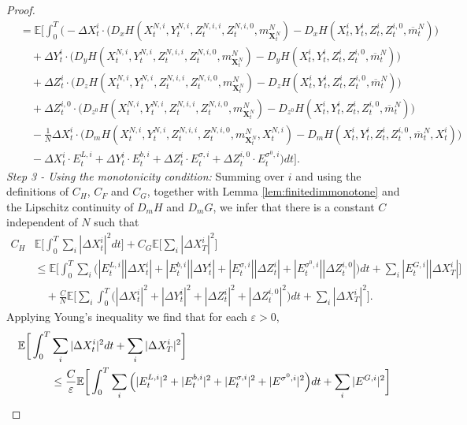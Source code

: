 \documentclass[11pt,reqno]{amsart}
\numberwithin{equation}{section}
\theoremstyle{definition}
\def\E{{\mathbb E}}
\newcommand{\bX}{\mathbf{X}}
\newcommand{\ov}{\overline}
\def \E{\mathbb{E}}
\begin{document}
\begin{proof}
\begin{align*}
&= \E\bigg[ \int_0^T \bigg( - \Delta X_t^i\cdot\Big( D_x H (X_t^{N,i},Y_t^{N,i},Z_t^{N,i,i},Z_t^{N,i,0}, m_{\bX_t^N}^N) - D_x H(X_t^i,Y_t^i,Z_t^i,Z_t^{i,0}, \ov{m}_t^N) \bigg)  \nonumber \\
&\quad + \Delta Y_t^i \cdot \Big(D_y H (X_t^{N,i},Y_t^{N,i},Z_t^{N,i,i},Z_t^{N,i,0}, m_{\bX_t^N}^N) - D_y H(X_t^i,Y_t^i,Z_t^i,Z_t^{i,0}, \ov{m}_t^N) \Big) \nonumber \\ 
&\quad +  \Delta Z_t^{i}\cdot\Big(D_z H (X_t^{N,i},Y_t^{N,i},Z_t^{N,i,i},Z_t^{N,i,0}, m_{\bX_t^N}^N) - D_z H(X_t^i,Y_t^i,Z_t^i,Z_t^{i,0}, \ov{m}_t^N) \Big) \nonumber \\ 
&\quad +  \Delta Z_t^{i,0}\cdot\Big( D_{z^0} H (X_t^{N,i},Y_t^{N,i},Z_t^{N,i,i},Z_t^{N,i,0}, m_{\bX_t^N}^N) - D_{z^0} H(X_t^i,Y_t^i,Z_t^i,Z_t^{i,0}, \ov{m}_t^N) \Big)   \nonumber \\
& \quad - \frac{1}{N} \Delta X_t^i \cdot \big(D_m H(X_t^{N,i}, Y_t^{N,i}, Z_t^{N,i,i}, Z_t^{N,i,0}, m_{\bX_t^N}^N, X_t^{N,i})
 - D_m H(X_t^{i}, Y_t^{i}, Z_t^{i}, Z_t^{i,0}, \ov{m}_t^N, X_t^i)
  \big) \nonumber \\
& \quad - \Delta X_t^i \cdot E_t^{L,i} + \Delta Y_t^i \cdot E_t^{b,i} + \Delta Z_t^i \cdot E_t^{\sigma,i} + \Delta Z_t^{i,0} \cdot E_t^{\sigma^0,i} \bigg) dt \bigg]. 
\end{align*}
\textit{Step 3 - Using the monotonicity condition:}
Summing over $i$ and using the definitions of $C_H$, $C_F$ and $C_G$, together with Lemma \ref{lem:finitedimmonotone} and the Lipschitz continuity of $D_m H$ and $D_m G$, we infer that there is a constant $C$ independent of $N$ such that
\begin{align*}
C_H& \E\bigg[\int_0^T \sum_i |\Delta X_t^i|^2 dt \bigg] + C_G \E\Big[\sum_i |\Delta X_T^i|^2\Big] \\
&\leq \E \bigg[ \int_0^T \sum_i \Big( |E_t^{L,i}||\Delta X_t^i| + |E_t^{b,i}||\Delta Y_t^i| + |E_t^{\sigma,i}||\Delta Z_t^i| + |E_t^{\sigma^0,i}||\Delta Z_t^{i,0}| \Big)  dt + \sum_i |E_t^{G,i}| |\Delta X_T^i| \bigg] \\
&\quad + \frac{C}{N} \E\bigg[\sum_i \int_0^T \Big( |\Delta X_t^i|^2 + |\Delta Y_t^i|^2 + |\Delta Z_t^i|^2 + |\Delta Z_t^{i,0}|^2 \Big) dt + \sum_i |\Delta X_T^i|^2 \bigg].
\end{align*}
Applying Young's inequality we find that for each $\varepsilon > 0$, 
\begin{align} \notag
\E\bigg[\int_0^T &\sum_i |\Delta X_t^i|^2 dt + \sum_i |\Delta X_T^i|^2 \bigg]\\\notag
 &\leq \frac{C}{\varepsilon} \E \bigg[ \int_0^T  \sum_i \Big(|E_t^{L,i}|^2 + |E_t^{b,i}|^2 + |E_t^{\sigma,i}|^2 + |E^{\sigma^0,i}|^2 \Big) dt +  \sum_i |E^{G,i}|^2 \bigg] \nonumber  \\\label{firstest}

\end{align}
\end{proof}
\end{document}
